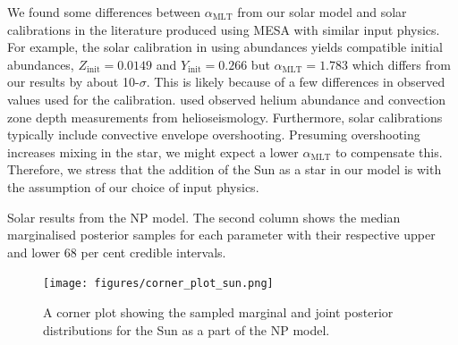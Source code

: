 \documentclass[a4paper,fleqn,usenatbib]{mnras}
\newcommand{\mlt}{\ensuremath{{\alpha_\mathrm{MLT}}}}
\begin{document}
We found some differences between $\mlt$ from our solar model and solar calibrations in the literature produced using \textsc{MESA} with similar input physics. For example, the solar calibration in \citet{Stancliffe.Fossati.ea2016} using \citet{Asplund.Grevesse.ea2009} abundances yields compatible initial abundances, $Z_\mathrm{init} = 0.0149$ and $Y_\mathrm{init} = 0.266$ but $\mlt = 1.783$ which differs from our results by about 10-$\sigma$. This is likely because of a few differences in observed values used for the calibration. \citet{Stancliffe.Fossati.ea2016} used observed helium abundance and convection zone depth measurements from helioseismology. Furthermore, solar calibrations typically include convective envelope overshooting. Presuming overshooting increases mixing in the star, we might expect a lower $\mlt$ to compensate this. Therefore, we stress that the addition of the Sun as a star in our model is with the assumption of our choice of input physics.

\begin{table}
    \centering
    \caption{Solar results from the NP model. The second column shows the median marginalised posterior samples for each parameter with their respective upper and lower 68 per cent credible intervals.}
    \label{tab:sun-out}
    
\end{table}

\begin{figure}
    \centering
    \texttt{[image: figures/corner\_plot\_sun.png]}
    \caption{A corner plot showing the sampled marginal and joint posterior distributions for the Sun as a part of the NP model.}
    \label{fig:sun-results}
\end{figure}



\bsp	%
\label{lastpage}
\end{document}
